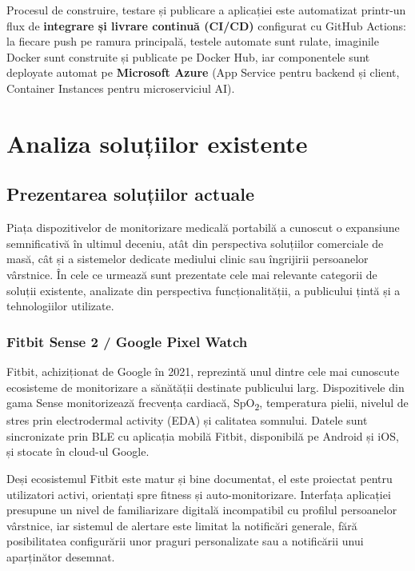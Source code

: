 \documentclass[12pt,a4paper,twoside]{article}
\newcommand{\spo}{SpO\textsubscript{2}}
\begin{document}
Procesul de construire, testare și publicare a aplicației este automatizat printr-un flux de \textbf{integrare și livrare continuă (CI/CD)} configurat cu GitHub Actions: la fiecare push pe ramura principală, testele automate sunt rulate, imaginile Docker sunt construite și publicate pe Docker Hub, iar componentele sunt deployate automat pe \textbf{Microsoft Azure} (App Service pentru backend și client, Container Instances pentru microserviciul AI).

\newpage
\section{Analiza soluțiilor existente}

\subsection{Prezentarea soluțiilor actuale}

Piața dispozitivelor de monitorizare medicală portabilă a cunoscut o expansiune semnificativă în ultimul deceniu, atât din perspectiva soluțiilor comerciale de masă, cât și a sistemelor dedicate mediului clinic sau îngrijirii persoanelor vârstnice. În cele ce urmează sunt prezentate cele mai relevante categorii de soluții existente, analizate din perspectiva funcționalității, a publicului țintă și a tehnologiilor utilizate.

\subsubsection{Fitbit Sense 2 / Google Pixel Watch}

Fitbit, achiziționat de Google în 2021, reprezintă unul dintre cele mai cunoscute ecosisteme de monitorizare a sănătății destinate publicului larg. Dispozitivele din gama Sense monitorizează frecvența cardiacă, \spo, temperatura pielii, nivelul de stres prin electrodermal activity (EDA) și calitatea somnului. Datele sunt sincronizate prin BLE cu aplicația mobilă Fitbit, disponibilă pe Android și iOS, și stocate în cloud-ul Google.

Deși ecosistemul Fitbit este matur și bine documentat, el este proiectat pentru utilizatori activi, orientați spre fitness și auto-monitorizare. Interfața aplicației presupune un nivel de familiarizare digitală incompatibil cu profilul persoanelor vârstnice, iar sistemul de alertare este limitat la notificări generale, fără posibilitatea configurării unor praguri personalizate sau a notificării unui aparținător desemnat.
\end{document}
